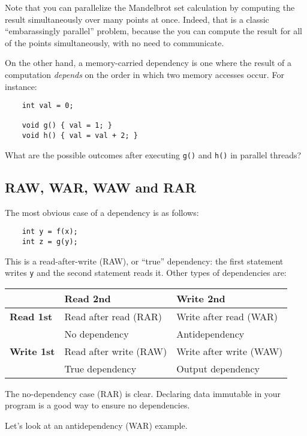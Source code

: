 \documentclass[11pt]{article}
\begin{document}
Note that you can parallelize the Mandelbrot set calculation
by computing the result simultaneously over many points at
once. Indeed, that is a classic ``embarassingly parallel'' problem,
because the you can compute the result for all of the points
simultaneously, with no need to communicate.

On the other hand, a memory-carried dependency is one where the result
of a computation \emph{depends} on the order in which two memory accesses
occur. For instance:

{\small \begin{verbatim}
    int val = 0;

    void g() { val = 1; }
    void h() { val = val + 2; }
\end{verbatim} }

{\sf What are the possible outcomes after executing {\tt g()} and {\tt h()}
in parallel threads?} \\[1em]

\subsection*{RAW, WAR, WAW and RAR}
The most obvious case of a dependency is as follows:
{\small \begin{verbatim}
    int y = f(x);
    int z = g(y);
\end{verbatim} }
This is a read-after-write (RAW), or ``true'' dependency: the first
statement writes {\tt y} and the second statement reads it.
Other types of dependencies are:

\begin{center}
\begin{tabular}{l|ll}
& {\bf Read 2nd} & {\bf Write 2nd} \\ \hline
{\bf Read 1st} & Read after read (RAR) & Write after read (WAR) \\
& No dependency & Antidependency \\
{\bf Write 1st} & Read after write (RAW) & Write after write (WAW) \\
& True dependency & Output dependency
\end{tabular}
\end{center}

The no-dependency case (RAR) is clear. Declaring data immutable 
in your program is a good way to ensure no dependencies.

Let's look at an antidependency (WAR) example.
\end{document}

